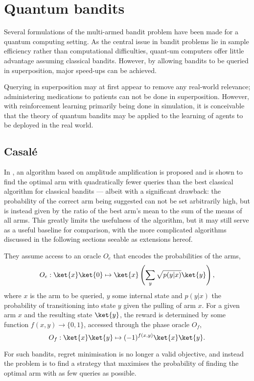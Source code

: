 \chapter{Quantum bandits}
\label{chap:qbandits}

Several formulations of the multi-armed bandit problem have been made for a quantum computing setting.
As the central issue in bandit problems lie in sample efficiency rather than computational difficulties, quant-um computers offer little advantage assuming classical bandits.
However, by allowing bandits to be queried in superposition, major speed-ups can be achieved.

Querying in superposition may at first appear to remove any real-world relevance; administering medications to patients can not be done in superposition.
However, with reinforcement learning primarily being done in simulation, it is conceivable that the theory of quantum bandits may be applied to the learning of agents to be deployed in the real world.



\section{Casalé}
In \cite{casale2020}, an algorithm based on amplitude amplification is proposed and is shown to find the optimal arm with quadratically fewer queries than the best classical algorithm for classical bandits — albeit with a significant drawback: the probability of the correct arm being suggested can not be set arbitrarily high, but is instead given by the ratio of the best arm's mean to the sum of the means of all arms.
This greatly limits the usefulness of the algorithm, but it may still serve as a useful baseline for comparison, with the more complicated algorithms discussed in the following sections seeable as extensions hereof.

They assume access to an oracle $O_e$ that encodes the probabilities of the arms,
\begin{equation}
    O_e: \ket{x}\ket{0} \mapsto \ket{x} \left(\sum_y \sqrt{p(y|x)} \ket{y}\right),
\end{equation}
where $x$ is the arm to be queried, $y$ some internal state and $p(y|x)$ the probability of transitioning into state $y$ given the pulling of arm $x$.
For a given arm $x$ and the resulting state $\ket{y}$, the reward is determined by some function $f(x,y) \to \{0, 1\}$, accessed through the phase oracle $O_f$,
\begin{equation}
    O_f :  \ket{x}\ket{y} \mapsto (-1)^{f(x,y)} \ket{x}\ket{y}.
\end{equation}

For such bandits, regret minimisation is no longer a valid objective, and instead the problem is to find a strategy that maximises the probability of finding the optimal arm with as few queries as possible.